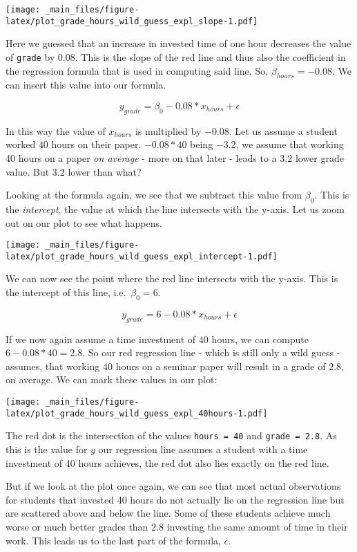 \documentclass[
]{book}
\begin{document}
\texttt{[image: \_main\_files/figure-latex/plot\_grade\_hours\_wild\_guess\_expl\_slope-1.pdf]}

Here we guessed that an increase in invested time of one hour decreases the
value of \texttt{grade} by \(0.08\). This is the slope of the red line and thus also the
coefficient in the regression formula that is used in computing said line. So,
\(\beta_{hours} = -0.08\). We can insert this value into our formula.

\[y_{grade} = \beta_0 -0.08*x_{hours} + \epsilon\]

In this way the value of \(x_{hours}\) is multiplied by \(-0.08\). Let us assume a
student worked \(40\) hours on their paper. \(-0.08*40\) being \(-3.2\), we assume that
working 40 hours on a paper \emph{on average} - more on that later - leads to a \(3.2\)
lower grade value. But \(3.2\) lower than what?

Looking at the formula again, we see that we subtract this value from \(\beta_0\).
This is the \emph{intercept}, the value at which the line intersects with the y-axis.
Let us zoom out on our plot to see what happens.

\texttt{[image: \_main\_files/figure-latex/plot\_grade\_hours\_wild\_guess\_expl\_intercept-1.pdf]}

We can now see the point where the red line intersects with the y-axis. This is
the intercept of this line, i.e.~\(\beta_0 = 6\).

\[y_{grade} = 6 -0.08*x_{hours} + \epsilon\]

If we now again assume a time investment of \(40\) hours, we can compute
\(6-0.08*40 = 2.8\). So our red regression line - which is still only a wild guess
- assumes, that working 40 hours on a seminar paper will result in a grade of
\(2.8\), on average. We can mark these values in our plot:

\texttt{[image: \_main\_files/figure-latex/plot\_grade\_hours\_wild\_guess\_expl\_40hours-1.pdf]}

The red dot is the intersection of the values \texttt{hours\ =\ 40} and \texttt{grade\ =\ 2.8}.
As this is the value for \(y\) our regression line assumes a student with a time
investment of 40 hours achieves, the red dot also lies exactly on the red line.

But if we look at the plot once again, we can see that most actual observations
for students that invested 40 hours do not actually lie on the regression line
but are scattered above and below the line. Some of these students achieve
much worse or much better grades than \(2.8\) investing the same amount of time in
their work. This leads us to the last part of the formula, \(\epsilon\).
\end{document}
